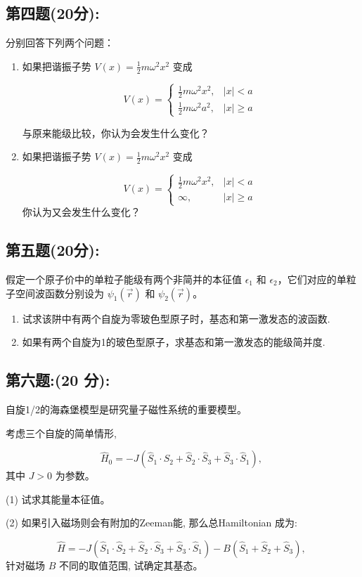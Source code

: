 \subsection{第四题(20分):}
分别回答下列两个问题：

\begin{enumerate}
    \item  如果把谐振子势 $V(x) = \frac{1}{2} m \omega^2 x^2$ 变成

    \[
    V(x) =
    \begin{cases}
    \frac{1}{2} m \omega^2 x^2, & |x| < a \\
    \frac{1}{2} m \omega^2 a^2, & |x| \geq a
    \end{cases}~
    \]

    与原来能级比较，你认为会发生什么变化？

    \item  如果把谐振子势 $V(x) = \frac{1}{2} m \omega^2 x^2$ 变成

    \[
    V(x) =
    \begin{cases}
    \frac{1}{2} m \omega^2 x^2, & |x| < a \\
    \infty, & |x| \geq a
    \end{cases}~
    \]
    你认为又会发生什么变化？
\end{enumerate}
\subsection{第五题(20分):}
假定一个原子价中的单粒子能级有两个非简并的本征值 $\epsilon_1$ 和 $\epsilon_2$，它们对应的单粒子空间波函数分别设为 $\psi_1(\vec r)$ 和 $\psi_2(\vec r)$。

\begin{enumerate}
    \item  试求该阱中有两个自旋为零玻色型原子时，基态和第一激发态的波函数.
    \item  如果有两个自旋为1的玻色型原子，求基态和第一激发态的能级简并度.
\end{enumerate}
\subsection{第六题:(20 分):}
自旋1/2的海森堡模型是研究量子磁性系统的重要模型。

考虑三个自旋的简单情形,

\[\hat{H}_0 = -J (\hat{S}_1 \cdot \hat{S}_2 + \hat{S}_2 \cdot \hat{S}_3 + \hat{S}_3 \cdot \hat{S}_1),~\]
其中 $J>0$ 为参数。

(1) 试求其能量本征值。

(2) 如果引入磁场则会有附加的Zeeman能, 那么总Hamiltonian 成为:

\[\hat{H} = -J (\hat{S}_1 \cdot \hat{S}_2 + \hat{S}_2 \cdot \hat{S}_3 + \hat{S}_3 \cdot \hat{S}_1) - B (\hat{S}_1 + \hat{S}_2 + \hat{S}_3),~\]
针对磁场 $B$ 不同的取值范围, 试确定其基态。